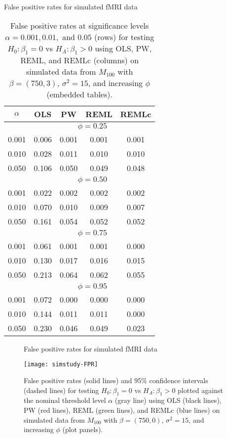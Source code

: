 \begin{table}
\ssp
\centering
\caption{False positive rates for simulated fMRI data} \label{tab:fmri:fpr}
\begin{tabular}{|c|cccc|}
\hline
$\alpha$ & OLS & PW & REML & REMLc \\
\hline
 & \multicolumn{4}{|c|}{$\phi = 0.25$} \\
\hline
0.001 & 0.006 & 0.001 & 0.001 & 0.001 \\
0.010 & 0.028 & 0.011 & 0.010 & 0.010 \\
0.050 & 0.106 & 0.050 & 0.049 & 0.048 \\
\hline
 & \multicolumn{4}{|c|}{$\phi = 0.50$} \\
\hline
0.001 & 0.022 & 0.002 & 0.002 & 0.002 \\
0.010 & 0.070 & 0.010 & 0.009 & 0.007 \\
0.050 & 0.161 & 0.054 & 0.052 & 0.052 \\
\hline
 & \multicolumn{4}{|c|}{$\phi = 0.75$} \\
\hline
0.001 & 0.061 & 0.001 & 0.001 & 0.000 \\
0.010 & 0.130 & 0.017 & 0.016 & 0.015 \\
0.050 & 0.213 & 0.064 & 0.062 & 0.055 \\
\hline
 & \multicolumn{4}{|c|}{$\phi = 0.95$} \\
\hline
0.001 & 0.072 & 0.000 & 0.000 & 0.000 \\
0.010 & 0.144 & 0.011 & 0.011 & 0.000 \\
0.050 & 0.230 & 0.046 & 0.049 & 0.023 \\
\hline
\end{tabular}
\caption*{False positive rates at significance levels $\alpha = 0.001, 0.01, \mbox{ and } 0.05$ (rows) for testing $H_0: \beta_1 = 0$ vs $H_A: \beta_1 > 0$ using OLS, PW, REML, and REMLc (columns) on simulated data from $M_{100}$ with $\beta = (750, 3)$, $\sigma^2 = 15$, and increasing $\phi$ (embedded tables).}
\end{table}

\begin{figure}
\ssp
\centering
\caption{False positive rates for simulated fMRI data} \label{fig:fmri:fpr}
\texttt{[image: simstudy-FPR]}
\caption*{False positive rates (solid lines) and 95\% confidence intervals (dashed lines) for testing $H_0: \beta_1 = 0$ vs $H_A: \beta_1 > 0$ plotted against the nominal threshold level $\alpha$ (gray line) using OLS (black lines), PW (red lines), REML (green lines), and REMLc (blue lines) on simulated data from $M_{100}$ with $\beta = (750, 0)$, $\sigma^2 = 15$, and increasing $\phi$ (plot panels).}
\end{figure}


